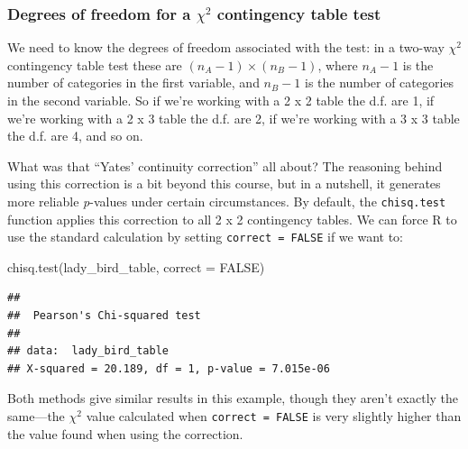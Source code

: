 \documentclass[
]{book}
\newenvironment{Shaded}{\begin{snugshade}}{\end{snugshade}}
\newcommand{\AttributeTok}[1]{\textcolor[rgb]{0.77,0.63,0.00}{#1}}
\newcommand{\ConstantTok}[1]{\textcolor[rgb]{0.00,0.00,0.00}{#1}}
\newcommand{\FunctionTok}[1]{\textcolor[rgb]{0.00,0.00,0.00}{#1}}
\newcommand{\NormalTok}[1]{#1}
\newenvironment{greybox}{
  \definecolor{shadecolor}{rgb}{0.95,0.95,0.95}  %
  \color{black}
  \begin{shaded}}
 {\end{shaded}}
\newenvironment{infobox}[1]
  {
  \begin{itemize}
  \renewcommand{\labelitemi}{
    \raisebox{-.7\height}[0pt][0pt]{
      {\setkeys{Gin}{width=3em,keepaspectratio}
        \texttt{[image: images/\#1]}}
    }
  }
  \setlength{\fboxsep}{1em}
  \begin{greybox}
  \item
  }
  {
  \end{greybox}
  \end{itemize}
  }
\begin{document}
\begin{infobox}{information}

\hypertarget{degrees-of-freedom-for-a-chi2-contingency-table-test}{%
\subsubsection*{\texorpdfstring{Degrees of freedom for a \(\chi^{2}\) contingency table test}{Degrees of freedom for a \textbackslash chi\^{}\{2\} contingency table test}}\label{degrees-of-freedom-for-a-chi2-contingency-table-test}}

We need to know the degrees of freedom associated with the test: in a two-way \(\chi^{2}\) contingency table test these are \((n_A-1) \times (n_B-1)\), where \(n_A-1\) is the number of categories in the first variable, and \(n_B-1\) is the number of categories in the second variable. So if we're working with a 2 x 2 table the d.f. are 1, if we're working with a 2 x 3 table the d.f. are 2, if we're working with a 3 x 3 table the d.f. are 4, and so on.

\end{infobox}

What was that ``Yates' continuity correction'' all about? The reasoning behind using this correction is a bit beyond this course, but in a nutshell, it generates more reliable \emph{p}-values under certain circumstances. By default, the \texttt{chisq.test} function applies this correction to all 2 x 2 contingency tables. We can force R to use the standard calculation by setting \texttt{correct\ =\ FALSE} if we want to:

\begin{Shaded}
\begin{Highlighting}[]
\FunctionTok{chisq.test}\NormalTok{(lady\_bird\_table, }\AttributeTok{correct =} \ConstantTok{FALSE}\NormalTok{)}
\end{Highlighting}
\end{Shaded}

\begin{verbatim}
## 
##  Pearson's Chi-squared test
## 
## data:  lady_bird_table
## X-squared = 20.189, df = 1, p-value = 7.015e-06
\end{verbatim}

Both methods give similar results in this example, though they aren't exactly the same---the \(\chi^{2}\) value calculated when \texttt{correct\ =\ FALSE} is very slightly higher than the value found when using the correction.
\end{document}
